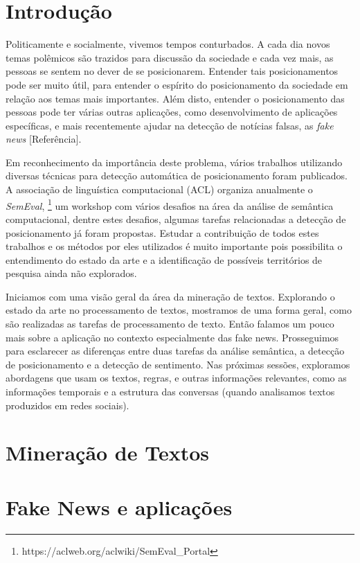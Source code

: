 \section{Introdução}
\quad Politicamente e socialmente, vivemos tempos conturbados. A cada dia
novos temas polêmicos são trazidos para discussão da sociedade e cada
vez mais, as pessoas se sentem no dever de se posicionarem. Entender
tais posicionamentos pode ser muito útil, para entender o espírito do
posicionamento da sociedade em relação aos temas mais importantes.
\quad Além disto, entender o posicionamento das pessoas pode ter
várias outras aplicações, como desenvolvimento de aplicações específicas,
e mais recentemente ajudar na detecção de notícias falsas, as 
\emph{fake news} [Referência].

\quad Em reconhecimento da importância deste problema, vários trabalhos
utilizando diversas técnicas para detecção automática de posicionamento
foram publicados. A associação de linguística computacional (ACL)
organiza anualmente o \emph{SemEval},
\footnote{https://aclweb.org/aclwiki/SemEval\_Portal} um workshop com vários
desafios na área da análise de semântica computacional, dentre estes
desafios, algumas tarefas relacionadas a detecção de posicionamento já
foram propostas. Estudar a contribuição de todos estes trabalhos e os
métodos por eles utilizados é muito importante pois possibilita o
entendimento do estado da arte e a identificação de possíveis
territórios de pesquisa ainda não explorados.

\quad Iniciamos com uma visão geral da área da mineração de textos. Explorando
o estado da arte no processamento de textos, mostramos de uma forma geral,
como são realizadas as tarefas de processamento de texto. Então falamos um
pouco mais sobre a aplicação no contexto especialmente das fake news.
Prosseguimos para esclarecer as diferenças entre duas tarefas da análise 
semântica, a detecção de posicionamento e a detecção de sentimento. Nas
próximas sessões, exploramos abordagens que usam os textos, regras, e outras
informações relevantes, como as informações temporais e a estrutura das
conversas (quando analisamos textos produzidos em redes sociais).

\section{Mineração de Textos}

\section{Fake News e aplicações}

